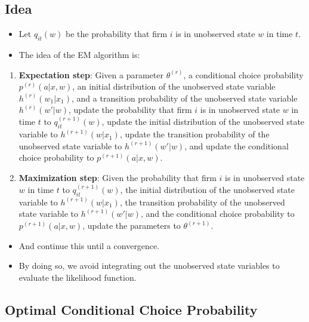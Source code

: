 \documentclass[
]{book}
\providecommand{\tightlist}{%
  \setlength{\itemsep}{0pt}\setlength{\parskip}{0pt}}
\begin{document}
\hypertarget{idea}{%
\subsection{Idea}\label{idea}}

\begin{itemize}
\tightlist
\item
  Let \(q_{it}(w)\) be the probability that firm \(i\) is in unobserved state \(w\) in time \(t\).
\item
  The idea of the EM algorithm is:
\end{itemize}

\begin{enumerate}
\def\labelenumi{\arabic{enumi}.}
\tightlist
\item
  \textbf{Expectation step}: Given a parameter \(\theta^{(r)}\), a conditional choice probability \(p^{(r)}(a|x, w)\), an initial distribution of the unobserved state variable \(h^{(r)}(w_1|x_1)\), and a transition probability of the unobserved state variable \(h^{(r)}(w'|w)\), update the probability that firm \(i\) is in unobserved state \(w\) in time \(t\) to \(q_{it}^{(r + 1)}(w)\), update the initial distribution of the unobserved state variable to \(h^{(r + 1)}(w|x_1)\), update the transition probability of the unobserved state variable to \(h^{(r + 1)}(w'|w)\), and update the conditional choice probability to \(p^{(r + 1)}(a|x, w)\).
\item
  \textbf{Maximization step}: Given the probability that firm \(i\) is in unobserved state \(w\) in time \(t\) to \(q_{it}^{(r + 1)}(w)\), the initial distribution of the unobserved state variable to \(h^{(r + 1)}(w|x_1)\), the transition probability of the unobserved state variable to \(h^{(r + 1)}(w'|w)\), and the conditional choice probability to \(p^{(r + 1)}(a|x, w)\), update the parameters to \(\theta^{(r + 1)}\).
\end{enumerate}

\begin{itemize}
\tightlist
\item
  And continue this until a convergence.
\item
  By doing so, we avoid integrating out the unobserved state variables to evaluate the likelihood function.
\end{itemize}

\hypertarget{optimal-conditional-choice-probability-1}{%
\subsection{Optimal Conditional Choice Probability}\label{optimal-conditional-choice-probability-1}}
\end{document}
